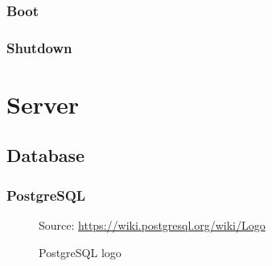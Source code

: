 \subsubsection{Boot}
\label{subsubsec:implementation_installer_services_boot}

\subsubsection{Shutdown}
\label{subsubsec:implementation_installer_services_shutdown}

\section{Server}
\label{sec:implementation_server}

\subsection{Database}
\label{subsec:implementation_server_database}

\subsubsection{PostgreSQL}
\label{subsubsec:implementation_server_database_postgresql}

\begin{figure} %
  \centering
  \def\stackalignment{r} %
  {\scriptsize \parbox[t]{\linewidth}{ Source: \url{https://wiki.postgresql.org/wiki/Logo}} }
  \caption{PostgreSQL logo}
\end{figure}

